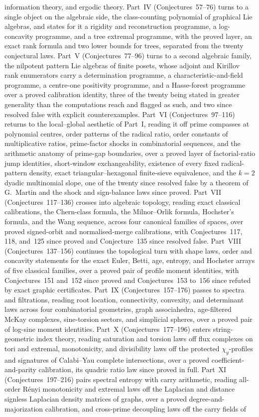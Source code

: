 \documentclass[11pt]{article}
\theoremstyle{definition}
\begin{document}
information theory, and ergodic theory.  Part~IV (Conjectures~57--76) turns to a single object on the algebraic side, the class-counting polynomial of graphical Lie algebras, and states for it a rigidity and reconstruction programme, a log-concavity programme, and a tree extremal programme, with the proved layer, an exact rank formula and two lower bounds for trees, separated from the twenty conjectural laws.  Part~V (Conjectures~77--96) turns to a second algebraic family, the nilpotent pattern Lie algebras of finite posets, whose adjoint and Kirillov rank enumerators carry a determination programme, a characteristic-and-field programme, a centre-one positivity programme, and a Hasse-forest programme over a proved calibration identity, three of the twenty being stated in greater generality than the computations reach and flagged as such, and two since resolved false with explicit counterexamples.  Part~VI (Conjectures~97--116) returns to the local--global aesthetic of Part~I, reading it off prime compasses at polynomial centres, order patterns of the radical ratio, order constants of multiplicative ratios, prime-factor shocks in combinatorial sequences, and the arithmetic anatomy of prime-gap boundaries, over a proved layer of factorial-ratio jump identities, short-window exchangeability, existence of every fixed radical-pattern density, exact triangular--hexagonal finite-sieve equivalence, and the $k=2$ dyadic multinomial slope, one of the twenty since resolved false by a theorem of G.~Martin and the shock and sign-balance laws since proved.  Part~VII (Conjectures~117--136) crosses into algebraic topology, reading exact classical calibrations, the Chern-class formula, the Milnor--Orlik formula, Hochster's formula, and the Wang sequence, across four canonical families of spaces, over proved signed-orbit and normalised-merge calibrations, with Conjectures~117, 118, and~125 since proved and Conjecture~135 since resolved false.  Part~VIII (Conjectures~137--156) continues the topological turn with shape laws, order and concavity statements for the exact Euler, Betti, age, entropy, and Hochster arrays of five classical families, over a proved pair of profile moment identities, with Conjectures~151 and~152 since proved and Conjectures~153 to~156 since refuted by exact graphic certificates.  Part~IX (Conjectures~157--176) passes to spectra and filtrations, reading root location, connectivity, convexity, and determinant laws across four combinatorial geometries, graph associahedra, age-filtered McKay complexes, sine-torsion sectors, and simplicial spheres, over a proved pair of log-sine moment identities.  Part~X (Conjectures~177--196) enters string-geometric index theory, reading saturation and torsion laws off flux complexes on tori and extremal, monotonicity, and divisibility laws off the protected $\chi_y$-profiles and signatures of Calabi--Yau complete intersections, over a proved coefficient-and-parity calibration, its quadric ratio law since proved in full.  Part~XI (Conjectures~197--216) pairs spectral entropy with carry arithmetic, reading all-order R\'enyi monotonicity and extremal laws off the Laplacian and distance signless Laplacian density matrices of graphs, over a proved degree-and-majorization calibration, and cross-prime decoupling laws off the carry fields of 
\end{document}
